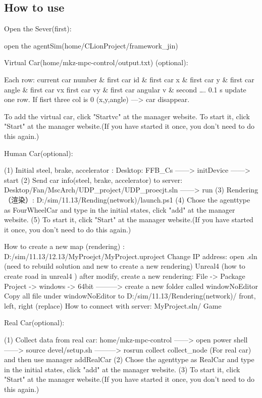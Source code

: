 \subsection*{How to use}

Open the Sever(first)\+: \begin{DoxyVerb}open the agentSim(home/CLionProject/framework_jin)
\end{DoxyVerb}


Virtual Car(home/mkz-\/mpc-\/control/output.\+txt) (optional)\+: \begin{DoxyVerb}Each row: current car number & first car id & first car x & first car y & first car angle & first car vx first car vy & first car angular v & second ….
0.1 s update one row.
If fisrt three col is 0 (x,y,angle) —> car disappear.

To add the virtual car, click "Startvc" at the manager website.
To start it, click "Start" at the manager website.(If you have started it once, you don't need to do this again.)
\end{DoxyVerb}


Human Car(optional)\+: \begin{DoxyVerb}(1) Initial steel, brake, accelerator : Desktop: FFB_Cs ——> initDevice ——> start
(2) Send car info(steel, brake, accelerator) to server: Desktop/Fan/MscArch/UDP_project/UDP_proecjt.sln ——> run
(3) Rendering（渲染）: D:/sim/11.13/Rending(network)/launch.ps1
(4) Chose the agenttype as FourWheelCar and type in the initial states, click "add" at the manager website.
(5) To start it, click "Start" at the manager website.(If you have started it once, you don't need to do this again.)

How to create a new map (rendering) : D:/sim/11.13/12.13/MyProejct/MyProject.uproject
    Change IP address: open .sln (need to rebuild solution and new to create a new rendering)
    Unreal4 (how to create road in unreal4 )
    after modify, create a new rendering: File -> Package Project -> windows -> 64bit ———> create a new folder called windowNoEditor
    Copy all file under windowNoEditor to D:/sim/11.13/Rendering(network)/ front, left, right (replace)
    How to connect with server: MyProject.sln/ Game
\end{DoxyVerb}


Real Car(optional)\+: \begin{DoxyVerb}(1) Collect data from real car: home/mkz-mpc-control ——> open power shell ——> source devel/setup.sh ———> rosrun collect collect_node (For real car)  and then use manager addRealCar
(2) Chose the agenttype as RealCar and type in the initial states, click "add" at the manager website.
(3) To start it, click "Start" at the manager website.(If you have started it once, you don't need to do this again.)
\end{DoxyVerb}


